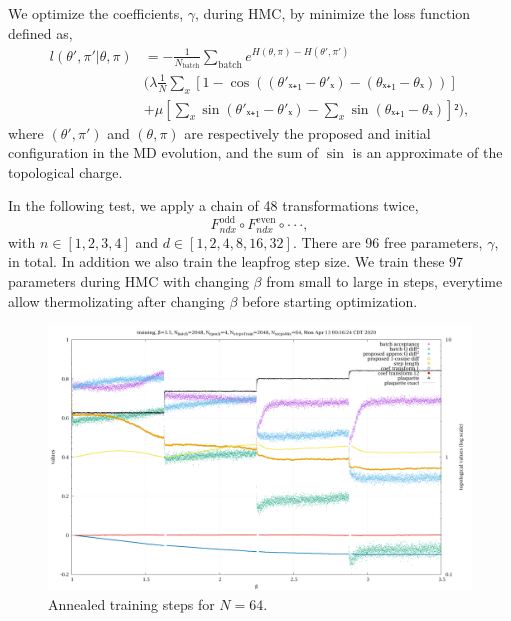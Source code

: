 We optimize the coefficients, $γ$, during HMC,
by minimize the loss function defined as,
\begin{equation}
\begin{split}
	l(θ',π'|θ,π) &= - \frac{1}{N_{\text{batch}}} \sum_{\text{batch}}
	e^{H(θ,π)-H(θ',π')} \\
	&\Bigg(
		λ \frac{1}{N} \sum_x \left[ 1-\cos\left((θ'ₓ₊₁-θ'ₓ)-(θₓ₊₁-θₓ)\right) \right] \\
		&+ μ \left[ \sum_x \sin(θ'ₓ₊₁-θ'ₓ)-\sum_x \sin(θₓ₊₁-θₓ) \right]²
	\Bigg),
\end{split}
\end{equation}
where $(θ',π')$ and $(θ,π)$ are respectively the proposed and initial configuration
in the MD evolution,
and the sum of $\sin$ is an approximate of the topological charge.

In the following test, we apply a chain of 48 transformations twice,
\begin{equation}
	F_{ndx}^{\text{odd}} \circ F_{ndx}^{\text{even}} \circ \cdot\cdot\cdot,
\end{equation}
with $n∈[1,2,3,4]$ and $d∈[1,2,4,8,16,32]$.
There are 96 free parameters, $γ$, in total.
In addition we also train the leapfrog step size.
We train these 97 parameters during HMC with changing $β$
from small to large in steps,
everytime allow thermolizating after changing $β$ before starting optimization.

\begin{figure}
	\centering
	\includegraphics[width=\textwidth]{../t13.png}
	\caption{\label{training}Annealed training steps for $N=64$.}
\end{figure}

